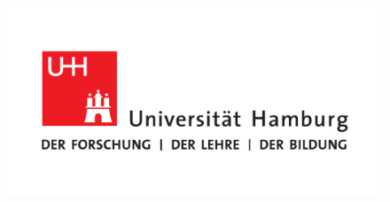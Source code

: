 
\begin{titlepage}

\setcounter{page}{-1}    

\begin{figure}[h]
    
     \begin{flushleft}
     	
     \end{flushleft}
     \hspace{-40px}
     \noindent\begin{minipage}[t][0px][b]{0.3\textwidth}
     	\noindent\includegraphics[scale=0.3]{images/UHH-Logo_2010_Farbe_CMYK.pdf}
     \end{minipage}
     \hspace{50px}
     \begin{flushright}
     	
     	\begin{minipage}[t][-70px][b]{0.38\textwidth}
     		\begin{flushright}
     			\sffamily{
     			}
     		\end{flushright}
     	\end{minipage}
     	\hspace{5px}
     	\begin{minipage}[t][-47px][b]{0.14\textwidth}
     	\end{minipage}
     \end{flushright}
     


\end{figure}
\end{titlepage}
